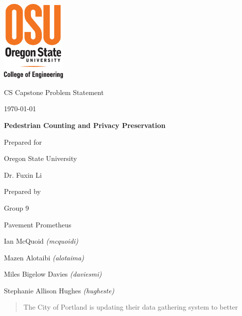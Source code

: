 \documentclass[onecolumn, draftclsnofoot,10pt, compsoc]{IEEEtran}
\def \CapstoneTeamName{		Pavement Prometheus}
\def \CapstoneTeamNumber{		9}
\def \GroupMemberOne{			Ian McQuoid  \textit{(mcquoidi)}}
\def \GroupMemberTwo{			Mazen Alotaibi \textit{(alotaima)}}
\def \GroupMemberThree{			Miles Bigelow Davies  \textit{(daviesmi)}}
\def \GroupMemberFour{			Stephanie Allison Hughes \textit{(hugheste)}}
\def \CapstoneProjectName{		Pedestrian Counting and Privacy Preservation}
\def \CapstoneSponsorCompany{	Oregon State University}
\def \CapstoneSponsorPerson{		Dr. Fuxin Li}
\def \DocType{		Problem Statement
				}
\newcommand{\NameSigPair}[1]{\par
\makebox[2.75in][r]{#1} \hfil 	\makebox[3.25in]{\makebox[2.25in]{\hrulefill} \hfill		\makebox[.75in]{\hrulefill}}
\par\vspace{-12pt} \textit{\tiny\noindent
\makebox[2.75in]{} \hfil		\makebox[3.25in]{\makebox[2.25in][r]{Signature} \hfill	\makebox[.75in][r]{Date}}}}
\renewcommand{\NameSigPair}[1]{#1}
\begin{document}
\begin{titlepage}
    \begin{singlespace}
    	\includegraphics[height=4cm]{coe_v_spot1}
        \hfill 
        \par\vspace{.2in}
        \centering
        \scshape{
            \huge CS Capstone \DocType \par
            {\large\today}\par
            \vspace{.5in}
            \textbf{\Huge\CapstoneProjectName}\par
            {\large Prepared for}\par
            \Huge \CapstoneSponsorCompany\par
            \vspace{5pt}
            {\Large\NameSigPair{\CapstoneSponsorPerson}\par}
            {\large Prepared by }\par
            Group\CapstoneTeamNumber\par
            \CapstoneTeamName\par 
            \vspace{5pt}
            {\Large
                \NameSigPair{\GroupMemberOne}\par
                \NameSigPair{\GroupMemberTwo}\par
                \NameSigPair{\GroupMemberThree}\par
                \NameSigPair{\GroupMemberFour}\par
            }
            \vspace{20pt}
        }
        \begin{abstract}
        The City of Portland is updating their data gathering system to better 

\end{abstract}
\end{singlespace}
\end{titlepage}
\end{document}
